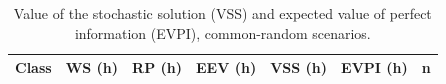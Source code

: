 \begin{table}[ht]\centering
\caption{Value of the stochastic solution (VSS) and expected value of perfect information (EVPI), common-random scenarios.}
\label{tab:vss}
\begin{tabular}{lrrrrrr}
\hline
Class & WS (h) & RP (h) & EEV (h) & VSS (h) & EVPI (h) & n \\
\hline
\hline
\end{tabular}
\end{table}
